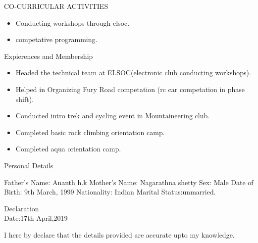 \documentclass[10pt]{article}
\begin{document}
		
	\begin{minipage}[t][2cm][t]{0.2\textwidth}
		CO-CURRICULAR ACTIVITIES
		
	\end{minipage}
	\begin{minipage}[t][2cm][t]{0.8\textwidth}
		\begin{itemize}
		\item Conducting workshops through elsoc.
		\item competative programming.
	
	\end{itemize}
		
	\end{minipage}



		\begin{minipage}[t][2cm][t]{0.2\textwidth}
		Expierences and Membership
		
	\end{minipage}
	\begin{minipage}[t][2cm][t]{0.8\textwidth}
		\begin{itemize}
			\item Headed the technical team at ELSOC(electronic club conducting workshops).
			\item Helped in Organizing Fury Road competation (rc car competation in phase shift).
			\item Conducted intro trek and cycling event in Mountaineering club.
			\item Completed basic rock climbing orientation  camp.
			\item Completed aqua orientation camp.
			
		\end{itemize}
		
	\end{minipage}


		
	\begin{minipage}[t][3cm][t]{0.2\textwidth}
		Personal Details
		
	\end{minipage}
	\begin{minipage}[t][3cm][t]{0.8\textwidth}
		Father's Name: Ananth h.k
		\newline Mother's Name: Nagarathna shetty
		\newline Sex: Male
		\newline Date of Birth: 9th March, 1999
		\newline Nationality: Indian
		\newline Marital Status:unmarried.
		
	\end{minipage}

	
		\begin{minipage}[t][2cm][t]{0.2\textwidth}
		Declaration
		\\
		Date:17th April,2019 
		
	\end{minipage}
	\begin{minipage}[t][2cm][t]{0.8\textwidth}
			I here by declare that the details provided are accurate upto my knowledge.
		
	\end{minipage}


	

	
	
\end{document}

